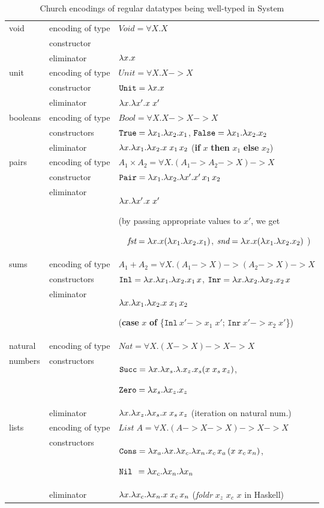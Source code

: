 \begin{table}
\begin{tabular}{p{15mm}|lp{92mm}}
	\hline
void
& encoding of type	& $\textit{Void} = \forall X.X$ \\
& constructor		& \\
& eliminator		& $\lambda x.x$
	\\\hline
unit
& encoding of type	& $\textit{Unit} = \forall X.X -> X$	\\
& constructor		& $\mathtt{Unit} = \lambda x.x$ \\
& eliminator		& $\lambda x.\lambda x'.x\;x'$
	\\\hline
booleans
& encoding of type	& $\textit{Bool} = \forall X.X -> X -> X$ \\
& constructors		& $\mathtt{True} = \lambda x_1.\lambda x_2. x_1$,\quad
			$\mathtt{False} = \lambda x_1.\lambda x_2. x_2$ \\
& eliminator		& $\lambda x.\lambda x_1. \lambda x_2. x\;x_1\,x_2$ \qquad
			(\textbf{if} $x$ \textbf{then} $x_1$ \textbf{else} $x_2$)
	\\\hline
pairs
& encoding of type	& $ A_1\times A_2 = \forall X. (A_1 -> A_2 -> X) -> X$ \\
& constructor		& $\mathtt{Pair} = \lambda x_1.\lambda x_2.\lambda x'.x'\,x_1\,x_2$ \\
& eliminator		& $\lambda x.\lambda x'.x\;x'$ \par
			(by passing appropriate values to $x'$, we get\par
			~~$\textit{fst} = \lambda x.x(\lambda x_1.\lambda x_2.x_1)$,
			$\textit{snd} = \lambda x.x(\lambda x_1.\lambda x_2.x_2)$ )
	\\\hline
sums
& encoding of type	& $A_1+A_2 = \forall X. (A_1 -> X) -> (A_2 -> X) -> X$ \\
& constructors		& $\mathtt{Inl} = \lambda x. \lambda x_1. \lambda x_2 . x_1\,x$,\quad
			$\mathtt{Inr} = \lambda x. \lambda x_2. \lambda x_2 . x_2\,x$ \\
& eliminator		& $\lambda x.\lambda x_1. \lambda x_2. x\;x_1\,x_2$ \par
			(\textbf{case} $x$ \textbf{of}
				\{$\mathtt{Inl}~x' -> x_1\;x'$;
				  $\mathtt{Inr}~x' -> x_2\;x'$\})
	\\\hline
natural
& encoding of type	& $\textit{Nat} = \forall X. (X -> X) -> X -> X$ \\
numbers
& constructors		& $\mathtt{Succ} = \lambda x. \lambda x_s. \lambda. x_z. x_s (x\;x_s\,x_z)$,\par
			$\mathtt{Zero} = \lambda x_s. \lambda x_z. x_z$ \\
& eliminator		& $\lambda x.\lambda x_z. \lambda x_s.x\;x_s\,x_z$ \quad
			(iteration on natural num.)
	\\\hline
lists
& encoding of type	& $\textit{List}\;A = \forall X. (A -> X -> X) -> X -> X$ \\
& constructors		& $\mathtt{Cons} = \lambda x_a.\lambda x.\lambda x_c.\lambda x_n. x_c\,x_a\,(x\;x_c\,x_n)$,\par
			$\mathtt{Nil}\;\, = \lambda x_c.\lambda x_n.\lambda x_n$ \\
& eliminator		& $\lambda x.\lambda x_c. \lambda x_n.x\;x_c\,x_n$ \quad
			(\textit{foldr} $x_z$ $x_c$ $x$ in Haskell)
	\\\hline
\end{tabular}
\caption{Church encodings of regular datatypes being well-typed in System \F}
\label{tbl:dataF}
\end{table}

